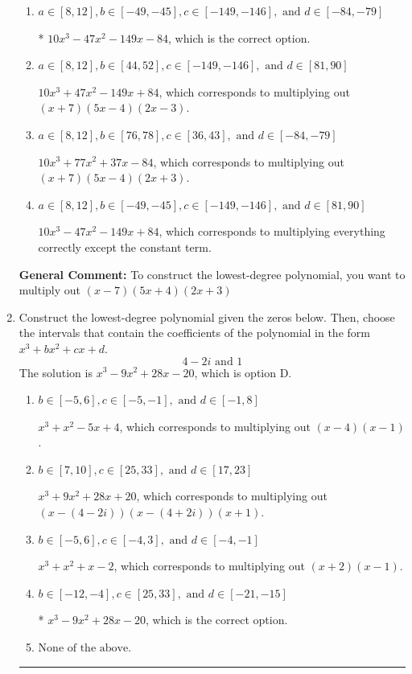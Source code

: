 \documentclass{extbook}[14pt]
\newcommand{\litem}[1]{\item #1

\rule{\textwidth}{0.4pt}}
\begin{document}
\begin{enumerate}
{\begin{enumerate}[label=\Alph*.]
$10x^{3} +93 x^{2} +173 x + 84$, which corresponds to multiplying out $(x + 7)(5x + 4)(2x + 3)$.
\item \( a \in [8, 12], b \in [-49, -45], c \in [-149, -146], \text{ and } d \in [-84, -79] \)

* $10x^{3} -47 x^{2} -149 x -84$, which is the correct option.
\item \( a \in [8, 12], b \in [44, 52], c \in [-149, -146], \text{ and } d \in [81, 90] \)

$10x^{3} +47 x^{2} -149 x + 84$, which corresponds to multiplying out $(x + 7)(5x -4)(2x -3)$.
\item \( a \in [8, 12], b \in [76, 78], c \in [36, 43], \text{ and } d \in [-84, -79] \)

$10x^{3} +77 x^{2} +37 x -84$, which corresponds to multiplying out $(x + 7)(5x -4)(2x + 3)$.
\item \( a \in [8, 12], b \in [-49, -45], c \in [-149, -146], \text{ and } d \in [81, 90] \)

$10x^{3} -47 x^{2} -149 x + 84$, which corresponds to multiplying everything correctly except the constant term.
\end{enumerate}

\textbf{General Comment:} To construct the lowest-degree polynomial, you want to multiply out $(x -7)(5x + 4)(2x + 3)$
}
\litem{
Construct the lowest-degree polynomial given the zeros below. Then, choose the intervals that contain the coefficients of the polynomial in the form $x^3+bx^2+cx+d$.
\[ 4 - 2 i \text{ and } 1 \]The solution is \( x^{3} -9 x^{2} +28 x -20 \), which is option D.\begin{enumerate}[label=\Alph*.]
\item \( b \in [-5, 6], c \in [-5, -1], \text{ and } d \in [-1, 8] \)

$x^{3} + x^{2} -5 x + 4$, which corresponds to multiplying out $(x -4)(x -1)$.
\item \( b \in [7, 10], c \in [25, 33], \text{ and } d \in [17, 23] \)

$x^{3} +9 x^{2} +28 x + 20$, which corresponds to multiplying out $(x-(4 - 2 i))(x-(4 + 2 i))(x + 1)$.
\item \( b \in [-5, 6], c \in [-4, 3], \text{ and } d \in [-4, -1] \)

$x^{3} + x^{2} +x -2$, which corresponds to multiplying out $(x + 2)(x -1)$.
\item \( b \in [-12, -4], c \in [25, 33], \text{ and } d \in [-21, -15] \)

* $x^{3} -9 x^{2} +28 x -20$, which is the correct option.
\item \( \text{None of the above.} \)


\end{enumerate}}
\end{enumerate}
\end{document}
